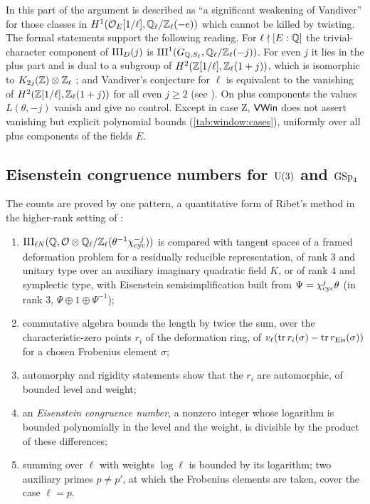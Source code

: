 \begin{remark}\label{rem:window:vandiver}
In \cite{Announcement2026} this part of the argument is described as ``a significant weakening of Vandiver''
for those classes in $H^1(\mathcal{O}_E[1/\ell],\mathbb{Q}_\ell/\mathbb{Z}_\ell(-e))$ which cannot be killed by twisting. The formal
statements support the following reading. For $\ell\nmid[E:\mathbb{Q}]$ the trivial-character component of $\mathrm{III}_D(j)$ is
$\mathrm{III}^1(G_{\mathbb{Q},S_\ell},\mathbb{Q}_\ell/\mathbb{Z}_\ell(-j))$. For even $j$ it lies in the plus part and is dual to a subgroup of
$H^2(\mathbb{Z}[1/\ell],\mathbb{Z}_\ell(1+j))$, which is isomorphic to $K_{2j}(\mathbb{Z})\otimes\mathbb{Z}_\ell$ \cite{Soule1979,Voevodsky2011}; and
Vandiver's conjecture for $\ell$ is equivalent to the vanishing of $H^2(\mathbb{Z}[1/\ell],\mathbb{Z}_\ell(1+j))$ for all even $j\ge2$
(see \cite{Kurihara1992}). On plus components the values $L(\theta,-j)$ vanish and give no control. Except in case Z,
$\mathsf{VWin}$ does not assert vanishing but explicit polynomial bounds (\cref{tab:window:cases}), uniformly over
all plus components of the fields $E$.
\end{remark}

\subsection{Eisenstein congruence numbers for \texorpdfstring{$\operatorname{U}(3)$}{U(3)} and \texorpdfstring{$\operatorname{GSp}_4$}{GSp(4)}}\label{sec:window:eis}

The counts are proved by one pattern, a quantitative form of Ribet's method \cite{Ribet1976} in the higher-rank
setting of \cite{BellaicheChenevier2009}:
\begin{enumerate}[label=(\roman*)]
\item $\mathrm{III}_{\ell N}(\mathbb{Q},\mathcal{O}\otimes\mathbb{Q}_\ell/\mathbb{Z}_\ell(\theta^{-1}\chi_{\mathrm{cyc}}^{-j}))$ is compared with tangent spaces of a framed
  deformation problem for a residually reducible representation, of rank $3$ and unitary type over an auxiliary
  imaginary quadratic field $K$, or of rank $4$ and symplectic type, with Eisenstein semisimplification built from
  $\Psi=\chi_{\mathrm{cyc}}^j\theta$ (in rank $3$, $\Psi\oplus1\oplus\Psi^{-1}$);
\item commutative algebra bounds the length by twice the sum, over the characteristic-zero points $r_i$ of the
  deformation ring, of $v_\ell(\operatorname{tr} r_i(\sigma)-\operatorname{tr} r_{\mathrm{Eis}}(\sigma))$ for a chosen Frobenius element $\sigma$;
\item automorphy and rigidity statements show that the $r_i$ are automorphic, of bounded level and weight;
\item an \emph{Eisenstein congruence number}, a nonzero integer whose logarithm is bounded polynomially in the level
  and the weight, is divisible by the product of these differences;
\item summing over $\ell$ with weights $\log\ell$ is bounded by its logarithm; two auxiliary primes $p\ne p'$, at
  which the Frobenius elements are taken, cover the case $\ell=p$.
\end{enumerate}

